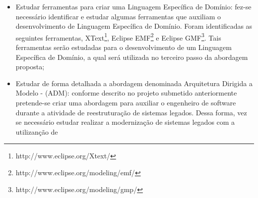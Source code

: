 \begin{itemize}

\item Estudar ferramentas para criar uma Linguagem Específica de Domínio: fez-se necessário identificar e estudar algumas ferramentas que auxiliam o desenvolvimento de Linguagem Específica de Domínio. Foram identificadas as seguintes ferramentas, XText\footnote{http://www.eclipse.org/Xtext/}, Eclipse EMF\footnote{http://www.eclipse.org/modeling/emf/} e Eclipse GMF\footnote{http://www.eclipse.org/modeling/gmp/}. Tais ferramentas serão estudadas para o desenvolvimento de um Linguagem Específica de Domínio, a qual será utilizada no terceiro passo da abordagem proposta;

\item Estudar de forma detalhada a abordagem denominada Arquitetura Dirigida a Modelo - (ADM): conforme descrito no projeto submetido anteriormente pretende-se criar uma abordagem para auxiliar o engenheiro de software durante a atividade de reestruturação de sistemas legados. Dessa forma, vez se necessário estudar realizar a modernização de sistemas legados com a utilizanção de 

\end{itemize}
